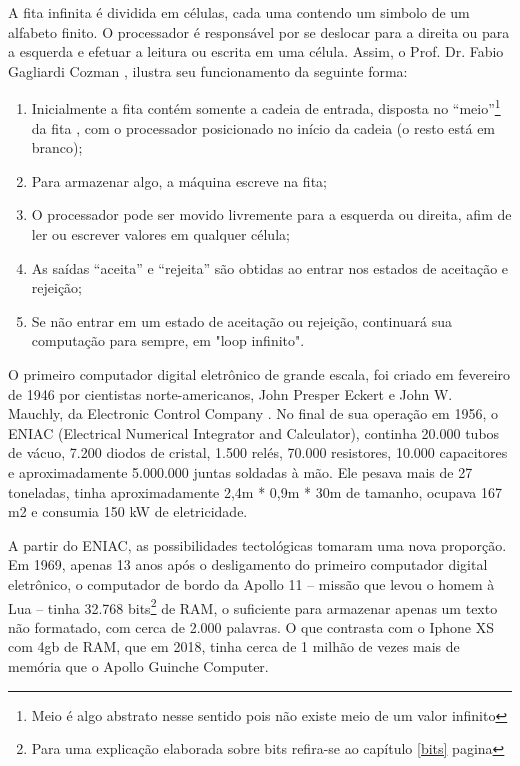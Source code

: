 A fita infinita é dividida em células, cada uma contendo um simbolo de um alfabeto finito. O processador é responsável por se deslocar para a direita ou para a esquerda e efetuar a leitura ou escrita em uma célula. Assim, o Prof. Dr. Fabio Gagliardi Cozman \cite{7}, ilustra seu funcionamento da seguinte forma:
\begin{enumerate}
  \item Inicialmente a fita contém somente a cadeia de entrada, disposta no “meio”\footnote{Meio é algo abstrato nesse sentido pois não existe meio de um valor infinito} da fita , com o processador posicionado no início da cadeia (o resto está em branco);
  \item Para armazenar algo, a máquina escreve na fita;
  \item O processador pode ser movido livremente para a esquerda ou direita, afim de ler ou escrever valores em qualquer célula;
  \item As saídas ``aceita'' e ``rejeita'' são obtidas ao entrar nos estados de aceitação e rejeição;
  \item Se não entrar em um estado de aceitação ou rejeição, continuará sua computação para sempre, em  "loop infinito".
\end{enumerate}

O primeiro computador digital eletrônico de grande escala, foi criado em fevereiro de 1946 por cientistas norte-americanos, John Presper Eckert e John W. Mauchly, da Electronic Control Company . No final de sua operação em 1956, o ENIAC (Electrical Numerical Integrator and Calculator), continha 20.000 tubos de vácuo, 7.200 diodos de cristal, 1.500 relés, 70.000 resistores, 10.000 capacitores e aproximadamente 5.000.000 juntas soldadas à mão. Ele pesava mais de 27 toneladas, tinha aproximadamente 2,4m * 0,9m * 30m de tamanho, ocupava 167 m2 e consumia 150 kW de eletricidade. \cite{2}

A partir do ENIAC, as possibilidades tectológicas tomaram uma nova proporção. Em 1969, apenas 13 anos após o desligamento do primeiro computador digital eletrônico, o computador de bordo da Apollo 11 – missão que levou o homem  à Lua – tinha 32.768 bits\footnote{Para uma explicação elaborada sobre bits refira-se ao capítulo \ref{bits} pagina \pageref{bits}} de RAM, o suficiente para armazenar apenas um texto não formatado, com cerca de 2.000 palavras. O que contrasta com o Iphone XS com 4gb de RAM, que em 2018, tinha cerca de 1 milhão de vezes mais de memória que o Apollo Guinche Computer. \cite{5}

